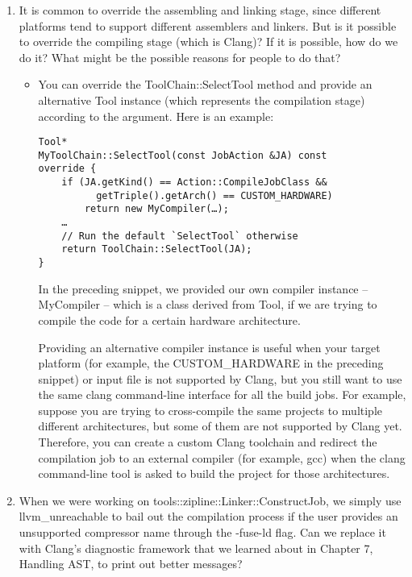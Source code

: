 \begin{enumerate}
\item It is common to override the assembling and linking stage, since different platforms tend to support different assemblers and linkers. But is it possible to override the compiling stage (which is Clang)? If it is possible, how do we do it? What might be the possible reasons for people to do that?

\begin{itemize}
\item You can override the ToolChain::SelectTool method and provide an alternative Tool instance (which represents the compilation stage) according to the argument. Here is an example:

\begin{lstlisting}[style=styleCXX]
Tool*
MyToolChain::SelectTool(const JobAction &JA) const
override {
	if (JA.getKind() == Action::CompileJobClass &&
		  getTriple().getArch() == CUSTOM_HARDWARE)
		return new MyCompiler(…);
	…
	// Run the default `SelectTool` otherwise
	return ToolChain::SelectTool(JA);
}
\end{lstlisting}

In the preceding snippet, we provided our own compiler instance – MyCompiler – which is a class derived from Tool, if we are trying to compile the code for a certain hardware architecture.

Providing an alternative compiler instance is useful when your target platform (for example, the CUSTOM\_HARDWARE in the preceding snippet) or input file is not supported by Clang, but you still want to use the same clang command-line interface for all the build jobs. For example, suppose you are trying to cross-compile the same projects to multiple different architectures, but some of them are not supported by Clang yet. Therefore, you can create a custom Clang toolchain and redirect the compilation job to an external compiler (for example, gcc) when the clang command-line tool is asked to build the project for those architectures.

\end{itemize}

\item When we were working on tools::zipline::Linker::ConstructJob, we simply use llvm\_unreachable to bail out the compilation process if the user provides an unsupported compressor name through the -fuse-ld flag. Can we replace it with Clang's diagnostic framework that we learned about in Chapter 7, Handling AST, to print out better messages?


\end{enumerate}
